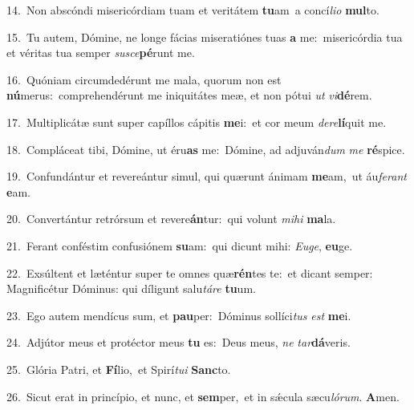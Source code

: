 {\numbfont\textcolor{\numbcolor}{14.}}~Non abscóndi misericórdiam tuam et veritátem \textbf{tu}\-am~\star a concí\-\textit{li}\-\textit{o} \textbf{mul}\-to.\par
{\numbfont\textcolor{\numbcolor}{15.}}~Tu autem, Dómine, ne longe fácias miseratiónes tuas \textbf{a} me:~\star misericórdia tua et véritas tua semper \textit{su}\-\textit{sce}\textbf{pé}runt me.\par
{\numbfont\textcolor{\numbcolor}{16.}}~Quóniam circumdedérunt me mala, quorum non est \textbf{nú}\-merus:~\star comprehendérunt me iniquitátes meæ, et non pótui \textit{ut} \textit{vi}\-\textbf{dé}rem.\par
{\numbfont\textcolor{\numbcolor}{17.}}~Multiplicátæ sunt super capíllos cápitis \textbf{me}\-i:~\star et cor meum \textit{de}\-\textit{re}\textbf{lí}quit me.\par
{\numbfont\textcolor{\numbcolor}{18.}}~Compláceat tibi, Dómine, ut éru\textbf{as} me:~\star Dómine, ad adjuván\textit{dum} \textit{me} \textbf{ré}\-spice.\par
{\numbfont\textcolor{\numbcolor}{19.}}~Confundántur et revereántur simul, qui quærunt ánimam \textbf{me}\-am,~\star ut áu\-\textit{fe}\-\textit{rant} \textbf{e}\-am.\par
{\numbfont\textcolor{\numbcolor}{20.}}~Convertántur retrórsum et revere\-\textbf{án}\-tur:~\star qui volunt \textit{mi}\-\textit{hi} \textbf{ma}\-la.\par
{\numbfont\textcolor{\numbcolor}{21.}}~Ferant conféstim confusiónem \textbf{su}\-am:~\star qui dicunt mihi: \textit{Eu}\-\textit{ge}, \textbf{eu}\-ge.\par
{\numbfont\textcolor{\numbcolor}{22.}}~Exsúltent et læténtur super te omnes quæ\-\textbf{rén}\-tes te:~\star et dicant semper: Magnificétur Dóminus: qui díligunt salu\-\textit{tá}\-\textit{re} \textbf{tu}\-um.\par
{\numbfont\textcolor{\numbcolor}{23.}}~Ego autem mendícus sum, et \textbf{pau}\-per:~\star Dóminus sollíci\textit{tus} \textit{est} \textbf{me}\-i.\par
{\numbfont\textcolor{\numbcolor}{24.}}~Adjútor meus et protéctor meus \textbf{tu} es:~\star Deus meus, \textit{ne} \textit{tar}\-\textbf{dá}veris.\par
{\numbfont\textcolor{\numbcolor}{25.}}~Glória Patri, et \textbf{Fí}\-lio,~\star et Spirí\-\textit{tu}\-\textit{i} \textbf{Sanc}\-to.\par
{\numbfont\textcolor{\numbcolor}{26.}}~Sicut erat in princípio, et nunc, et \textbf{sem}\-per,~\star et in sǽcula sæcu\-\textit{ló}\-\textit{rum}. \textbf{A}\-men.\par
